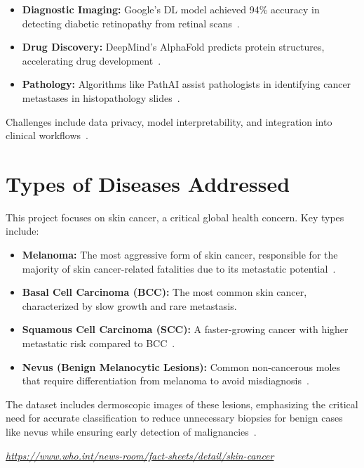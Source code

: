 \documentclass[a4paper,12pt]{report}
\begin{document}
\begin{spacing}{1.5}
    \begin{itemize}
        \item \textbf{Diagnostic Imaging:} Google’s DL model achieved 94\% accuracy in detecting diabetic retinopathy from retinal scans~\cite{dl8}.
        \item \textbf{Drug Discovery:} DeepMind’s AlphaFold predicts protein structures, accelerating drug development~\cite{dl9}.
        \item \textbf{Pathology:} Algorithms like PathAI assist pathologists in identifying cancer metastases in histopathology slides~\cite{dl10}.
    \end{itemize}
    Challenges include data privacy, model interpretability, and integration into clinical workflows~\cite{dl11}.
    
    \section{Types of Diseases Addressed}
    This project focuses on skin cancer, a critical global health concern. Key types include:
    
    \begin{itemize}
        \item \textbf{Melanoma:} The most aggressive form of skin cancer, responsible for the majority of skin cancer-related fatalities due to its metastatic potential~\cite{dl12}.
        \item \textbf{Basal Cell Carcinoma (BCC):} The most common skin cancer, characterized by slow growth and rare metastasis.
        \item \textbf{Squamous Cell Carcinoma (SCC):} A faster-growing cancer with higher metastatic risk compared to BCC~\cite{dl13}.
        \item \textbf{Nevus (Benign Melanocytic Lesions):} Common non-cancerous moles that require differentiation from melanoma to avoid misdiagnosis~\cite{dl14}.
    \end{itemize}
    The dataset includes dermoscopic images of these lesions, emphasizing the critical need for accurate classification to reduce unnecessary biopsies for benign cases like nevus while ensuring early detection of malignancies~\cite{dl15}.



\begin{thebibliography}{99}



 \emph{\url{https://www.who.int/news-room/fact-sheets/detail/skin-cancer}}


\end{thebibliography}
\end{spacing}
\end{document}
